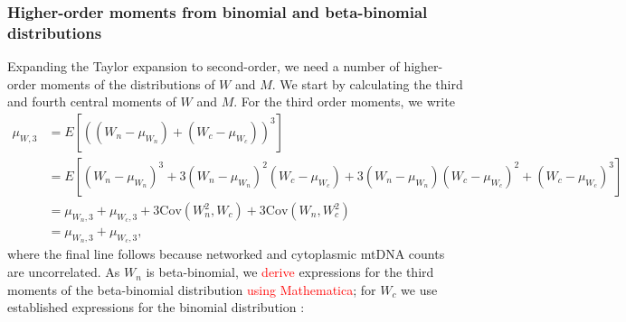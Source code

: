\documentclass{article}
\begin{document}
\begin{appendices}
{\subsubsection{Higher-order moments from binomial and beta-binomial distributions}
Expanding the Taylor expansion to second-order, we need a number of higher-order moments of the distributions of $W$ and $M$. We start by calculating the third and fourth central moments of $W$ and $M$. For the third order moments, we write
\begin{equation}\label{eq:thirdcentralW}
    \begin{split}
        \mu_{W,3}&=E[((W_n-\mu_{W_n})+(W_c-\mu_{W_c}))^3]\\
        &=E[(W_n-\mu_{W_n})^3+3(W_n-\mu_{W_n})^2(W_c-\mu_{W_c})+
          3(W_n-\mu_{W_n})(W_c-\mu_{W_c})^2+(W_c-\mu_{W_c})^3]\\
          &=\mu_{W_n,3}+\mu_{W_c,3}+3\mathrm{Cov}(W_n^2,W_c)+
            3\mathrm{Cov}(W_n,W_c^2)\\
          &=\mu_{W_n,3}+\mu_{W_c,3},
    \end{split}
\end{equation}
where the final line follows because networked and cytoplasmic mtDNA counts are uncorrelated. As $W_n$ is beta-binomial, we \textcolor{red}{derive} expressions for the third moments of the beta-binomial distribution \textcolor{red}{using Mathematica}; for $W_c$ we use established expressions for the binomial distribution \citep{knoblauch2008closed}:

}
\end{appendices}
\end{document}
